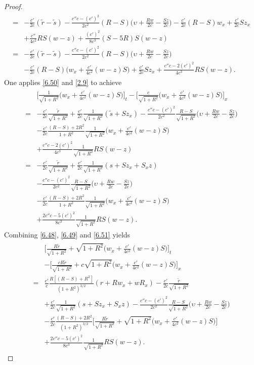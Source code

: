 \documentclass[11pt,reqno]{article}
\newcommand{\fr}{\frac}
\numberwithin{equation}{section}
\begin{document}
\begin{proof}
\begin{align}
\begin{split}
=&-\fr{c'}{2c}(\tilde{r}-\tilde{s}) -\fr{c''c-(c')^2}{2c^2}(R-S)\Big(\upsilon+\fr{Rw}{2c}-\fr{Sz}{2c}\Big) -\fr{c'}{2c}(R-S)w_x +\fr{c'}{2c}Sz_x \\
&+\fr{c''}{4c^2}RS(w-z) +\fr{(c')^2}{8c^3}(S-5R)S(w-z)
\\
=&-\fr{c'}{2c}(\tilde{r}-\tilde{s}) -\fr{c''c-(c')^2}{2c^2}(R-S)\Big(\upsilon+\fr{Rw}{2c}-\fr{Sz}{2c}\Big) \\
&-\fr{c'}{2c}(R-S)\Big(w_x+\fr{c'}{4c^2}(w-z)S\Big) +\fr{c'}{2c}Sz_x+\fr{c''c-2(c')^2}{4c^3}RS(w-z).
\end{split}
\end{align}
One applies \eqref{6.50} and \eqref{2.9} to achieve
\begin{align}\label{6.51}
\begin{split}
&\Big[\fr{1}{\sqrt{1+R^2}}\Big(w_x+\fr{c'}{4c^2}(w-z)S\Big)\Big]_t -\Big[\fr{c}{\sqrt{1+R^2}}\Big(w_x+\fr{c'}{4c^2}(w-z)S\Big)\Big]_x \\
=&-\fr{c'}{2c}\fr{\tilde{r}}{\sqrt{1+R^2}} +\fr{c'}{2c}\fr{1}{\sqrt{1+R^2}}(\tilde{s}+Sz_x) -\fr{c''c-(c')^2}{2c^2}\fr{R-S}{\sqrt{1+R^2}}\Big(\upsilon+\fr{Rw}{2c}-\fr{Sz}{2c}\Big) \\ &-\fr{c'}{2c}\fr{(R-S)+2R^2}{1+R^2}\fr{1}{\sqrt{1+R^2}}\Big(w_x+\fr{c'}{4c^2}(w-z)S\Big) \\ &+\fr{c''c-2(c')^2}{4c^3}\fr{1}{\sqrt{1+R^2}}RS(w-z) \\
=&-\fr{c'}{2c}\fr{\tilde{r}}{\sqrt{1+R^2}} +\fr{c'}{2c}\fr{1}{\sqrt{1+R^2}}(s+Sz_x +S_xz) \\ &-\fr{c''c-(c')^2}{2c^2}\fr{R-S}{\sqrt{1+R^2}}\Big(\upsilon+\fr{Rw}{2c}-\fr{Sz}{2c}\Big) \\ &-\fr{c'}{2c}\fr{(R-S)+2R^2}{1+R^2}\fr{1}{\sqrt{1+R^2}}\Big(w_x+\fr{c'}{4c^2}(w-z)S\Big) \\ &+\fr{2c''c-5(c')^2}{8c^3}\fr{1}{\sqrt{1+R^2}}RS(w-z).
\end{split}
\end{align}
Combining \eqref{6.48}, \eqref{6.49} and \eqref{6.51} yields
\begin{align}\label{6.52}
\begin{split}
&\Big[\fr{R\tilde{r}}{\sqrt{1+R^2}} +\sqrt{1+R^2}\Big(w_x+\fr{c'}{4c^2}(w-z)S\Big)\Big]_t \\ &-\Big[\fr{cR\tilde{r}}{\sqrt{1+R^2}} +c\sqrt{1+R^2}\Big(w_x+\fr{c'}{4c^2}(w-z)S\Big)\Big]_x \\
=& \fr{c'}{c}\fr{R[(R-S)+R^2]}{(1+R^2)^{3/2}}(r+Rw_x+wR_x) -\fr{c'}{2c}\fr{\tilde{r}}{\sqrt{1+R^2}} \\ &+\fr{c'}{2c}\fr{1}{\sqrt{1+R^2}}(s+Sz_x +S_xz)-\fr{c''c-(c')^2}{2c^2}\fr{R-S}{\sqrt{1+R^2}}\Big(\upsilon+\fr{Rw}{2c}-\fr{Sz}{2c}\Big) \\ &-\fr{c'}{2c}\fr{(R-S)+2R^2}{(1+R^2)^{3/2}}\Big[\fr{R\tilde{r}}{\sqrt{1+R^2}} +\sqrt{1+R^2}\Big(w_x+\fr{c'}{4c^2}(w-z)S\Big)\Big] \\ &+\fr{2c''c-5(c')^2}{8c^3}\fr{1}{\sqrt{1+R^2}}RS(w-z).

\end{split}
\end{align}
\end{proof}
\end{document}
